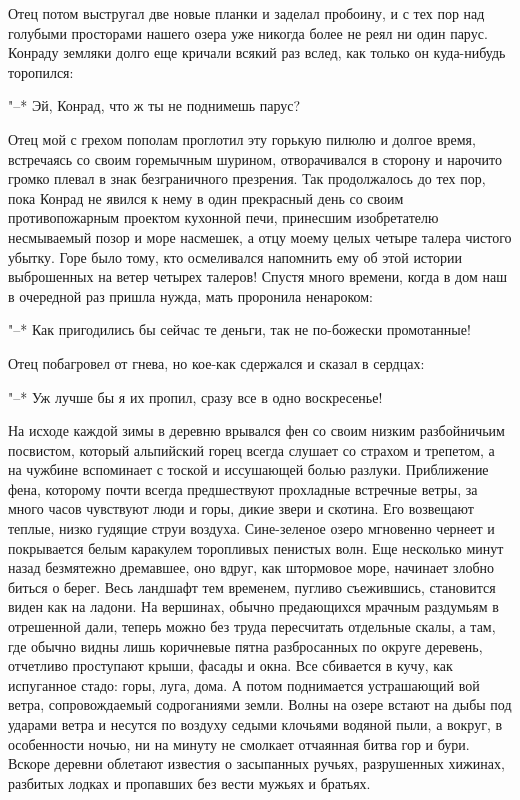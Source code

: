 Отец потом выстругал две новые планки  и заделал пробоину, и с тех пор
над голубыми просторами нашего озера уже никогда более не реял ни один
парус. Конраду земляки долго еще  кричали всякий раз вслед, как только
он куда-нибудь торопился:

"--* Эй, Конрад, что ж ты не поднимешь парус?

Отец  мой с  грехом  пополам  проглотил эту  горькую  пилюлю и  долгое
время,  встречаясь  со  своим   горемычным  шурином,  отворачивался  в
сторону и нарочито  громко плевал в знак  безграничного презрения. Так
продолжалось  до  тех  пор,  пока  Конрад не  явился  к  нему  в  один
прекрасный  день  со  своим противопожарным  проектом  кухонной  печи,
принесшим изобретателю несмываемый позор и море насмешек, а отцу моему
целых четыре  талера чистого убытку.  Горе было тому,  кто осмеливался
напомнить ему  об этой истории  выброшенных на ветер  четырех талеров!
Спустя много  времени, когда в дом  наш в очередной раз  пришла нужда,
мать проронила ненароком:

"--*  Как  пригодились   бы  сейчас  те  деньги,   так  не  по-божески
промотанные!

Отец побагровел от гнева, но кое-как сдержался и сказал в сердцах:

"--* Уж лучше бы я их пропил, сразу все в одно воскресенье!

На  исходе  каждой  зимы  в  деревню  врывался  фен  со  своим  низким
разбойничьим  посвистом, который  альпийский горец  всегда слушает  со
страхом  и трепетом,  а на  чужбине вспоминает  с тоской  и иссушающей
болью разлуки.  Приближение фена,  которому почти  всегда предшествуют
прохладные  встречные ветры,  за много  часов чувствуют  люди и  горы,
дикие  звери и  скотина.  Его возвещают  теплые,  низко гудящие  струи
воздуха.  Сине-зеленое озеро  мгновенно  чернеет  и покрывается  белым
каракулем  торопливых   пенистых  волн.  Еще  несколько   минут  назад
безмятежно дремавшее,  оно вдруг, как штормовое  море, начинает злобно
биться  о  берег.  Весь  ландшафт тем  временем,  пугливо  съежившись,
становится  виден  как  на  ладони. На  вершинах,  обычно  предающихся
мрачным  раздумьям   в  отрешенной   дали,  теперь  можно   без  труда
пересчитать отдельные скалы,  а там, где обычно  видны лишь коричневые
пятна  разбросанных по  округе деревень,  отчетливо проступают  крыши,
фасады и окна. Все сбивается в кучу, как испуганное стадо: горы, луга,
дома.  А  потом  поднимается  устрашающий  вой  ветра,  сопровождаемый
содроганиями  земли.  Волны  на  озере  встают  на  дыбы  под  ударами
ветра и  несутся по  воздуху седыми клочьями  водяной пыли,  а вокруг,
в  особенности  ночью,  ни  на  минуту  не  смолкает  отчаянная  битва
гор  и бури.  Вскоре деревни  облетают известия  о засыпанных  ручьях,
разрушенных хижинах,  разбитых лодках и  пропавших без вести  мужьях и
братьях.

